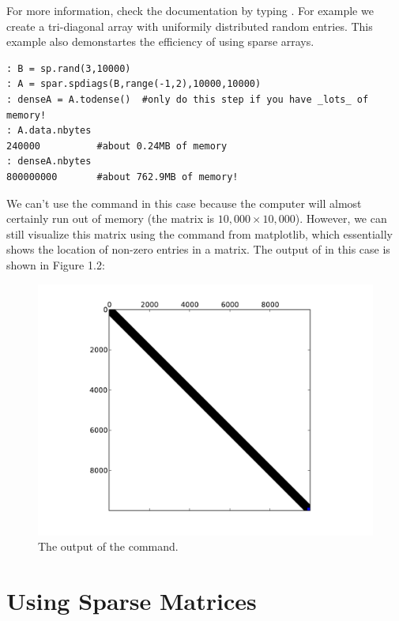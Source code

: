 For more information, check the documentation by typing . For example we create a tri-diagonal array with uniformily distributed random entries.  This example also demonstartes the efficiency of using sparse arrays.
\begin{lstlisting}[style=python]
: B = sp.rand(3,10000)
: A = spar.spdiags(B,range(-1,2),10000,10000)
: denseA = A.todense()  #only do this step if you have _lots_ of memory!
: A.data.nbytes
240000          #about 0.24MB of memory
: denseA.nbytes
800000000       #about 762.9MB of memory!
\end{lstlisting}


We can't use the  command in this case because the computer will almost certainly run out of memory (the matrix is $10,\!000 \times 10,\!000$). However, we can still visualize this matrix using the  command from matplotlib, which essentially shows the location of non-zero entries in a matrix. The output of  in this case is shown in Figure 1.2:

\begin{figure}[h!]
\begin{center}
\includegraphics[scale = .5]{./Figures/spy}
\end{center}
\caption{The output of the  command.}
\end{figure}

\section*{Using Sparse Matrices}

